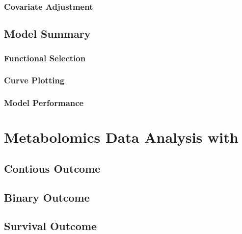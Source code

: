 \documentclass[
]{jss}
\begin{document}
\hypertarget{covariate-adjustment}{%
\subsubsection{Covariate Adjustment}\label{covariate-adjustment}}

\hypertarget{model-summary}{%
\subsection{Model Summary}\label{model-summary}}

\hypertarget{functional-selection}{%
\subsubsection{Functional Selection}\label{functional-selection}}

\hypertarget{curve-plotting}{%
\subsubsection{Curve Plotting}\label{curve-plotting}}

\hypertarget{model-performance}{%
\subsubsection{Model Performance}\label{model-performance}}

\section[Metabolomics Data Analysis with BHAM]{Metabolomics Data
Analysis with }\label{sec:analysis}

\hypertarget{contious-outcome}{%
\subsection{Contious Outcome}\label{contious-outcome}}

\hypertarget{binary-outcome}{%
\subsection{Binary Outcome}\label{binary-outcome}}

\hypertarget{survival-outcome}{%
\subsection{Survival Outcome}\label{survival-outcome}}
\end{document}
